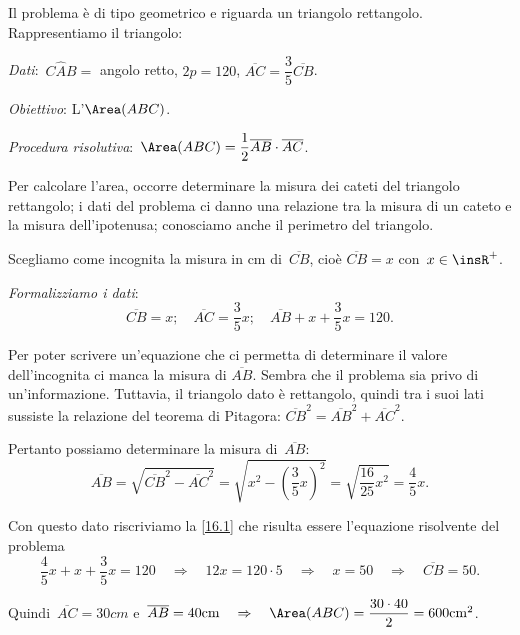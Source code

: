 \begin{soluzione}
 Il problema è di tipo geometrico e riguarda un triangolo rettangolo.
Rappresentiamo il triangolo:

\begin{multicols}{2}

\emph{Dati}:~$C\hat{A}B=$ angolo retto, $2p= 120$, $\overline{AC}=\dfrac{3}{5}\overline{CB}$.

\emph{Obiettivo}: L'$\Area (ABC)$.
\begin{center}
 
\end{center}
\end{multicols}



\emph{Procedura risolutiva}:~$\Area (ABC) =\dfrac{1}{2}\overline{AB}\cdot \overline{AC}$.

Per calcolare l'area, occorre determinare la misura dei
cateti del triangolo rettangolo; i dati del problema ci danno una
relazione tra la misura di un cateto e la misura
dell'ipotenusa; conosciamo anche il perimetro del
triangolo.

Scegliamo come incognita la misura in cm di~$\overline{CB}$, cioè
$\overline{CB}=x$ con~$x\in\insR^{+}$.

\emph{Formalizziamo i dati}:
 \begin{equation}\label{16.1}
 \overline{CB} =x;\quad \overline{AC} =\dfrac{3}{5}x;\quad \overline{AB} +x+\dfrac{3}{5}x=120.
 \end{equation}


Per poter scrivere un'equazione che ci permetta di determinare il
valore dell'incognita ci manca la misura di $\overline{AB}$. Sembra
che il problema sia privo di un'informazione. Tuttavia, il triangolo
dato è rettangolo, quindi tra i suoi lati sussiste la relazione del
teorema di Pitagora:
$\overline {CB}^{2}=\overline {AB}^{2}+\overline {AC}^{2}$.

Pertanto possiamo determinare la misura di~$\overline{AB}$:
\[\overline{AB}=\sqrt{\overline{CB}^{2}-\overline {AC}^{2}}=\sqrt{x^{2}-\left(\frac{3}{5}x\right)^{2}}=\sqrt{\frac{16}{25}x^{2}}=\frac{4}{5}x.\]

Con questo dato riscriviamo la \ref{16.1} che risulta essere
l'equazione risolvente del problema
\[\frac{4}{5}x+x+\dfrac{3}{5}x=120\quad\Rightarrow\quad 12x=120\cdot 5\quad\Rightarrow\quad x=50\quad\Rightarrow\quad\overline{CB}=50.\]

Quindi~$\overline {AC} = 30\unit{cm}$ e~$\overline {AB}= 40\unit{cm}\quad\Rightarrow\quad\Area (ABC)=\dfrac{30\cdot 40}{2}=600\unit{cm}^{2}$.
\end{soluzione}

\newpage

\cleardoublepage

